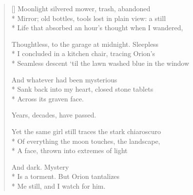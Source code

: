 \label{ch:neil_young_country}
\settowidth{\versewidth}{ \qquad  \qquad  \qquad           Years, decades, have passed.}
\begin{verse}[\versewidth]
Moonlight silvered mower, trash, abandoned\\*
Mirror; old bottles, tools lost in plain view: a still\\*
Life that absorbed an hour's thought when I wandered,

Thoughtless, to the garage at midnight. Sleepless\\*
I concluded in a kitchen chair, tracing Orion's\\*
Seamless descent `til the lawn washed blue in the window

And whatever had been mysterious\\*
Sank back into my heart, closed stone tablets\\*
Across its graven face.

 \qquad  \qquad  \qquad           Years, decades, have passed.

Yet the same girl still traces the stark chiaroscuro\\*
Of everything the moon touches, the landscape,\\*
A face, thrown into extremes of light

And dark.  Mystery\\*
Is a torment.  But Orion tantalizes \\*
Me still, and I watch for him.
\end{verse}
